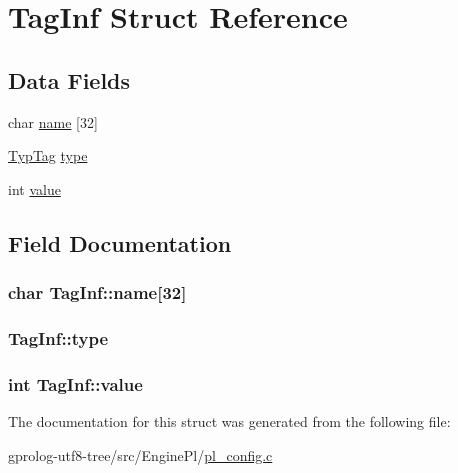 \hypertarget{structTagInf}{}\section{Tag\+Inf Struct Reference}
\label{structTagInf}
\subsection*{Data Fields}
\begin{DoxyCompactItemize}
\item 
char \hyperlink{structTagInf_a6dc0e60ac19532e7c8e1c30f73357c1c}{name} \mbox{[}32\mbox{]}
\item 
\hyperlink{pl__config_8c_a25e4946cfe40166e3e0aee5616116a87}{Typ\+Tag} \hyperlink{structTagInf_a1d109a0184537c9f448e28aa6c492b91}{type}
\item 
int \hyperlink{structTagInf_ae5a47ca79c53423fd961942af0647109}{value}
\end{DoxyCompactItemize}


\subsection{Field Documentation}
\subsubsection[{\texorpdfstring{name}{name}}]{\setlength{\rightskip}{0pt plus 5cm}char Tag\+Inf\+::name\mbox{[}32\mbox{]}}\hypertarget{structTagInf_a6dc0e60ac19532e7c8e1c30f73357c1c}{}\label{structTagInf_a6dc0e60ac19532e7c8e1c30f73357c1c}
\subsubsection[{\texorpdfstring{type}{type}}]{ Tag\+Inf\+::type}\hypertarget{structTagInf_a1d109a0184537c9f448e28aa6c492b91}{}\label{structTagInf_a1d109a0184537c9f448e28aa6c492b91}
\subsubsection[{\texorpdfstring{value}{value}}]{\setlength{\rightskip}{0pt plus 5cm}int Tag\+Inf\+::value}\hypertarget{structTagInf_ae5a47ca79c53423fd961942af0647109}{}\label{structTagInf_ae5a47ca79c53423fd961942af0647109}


The documentation for this struct was generated from the following file\+:\begin{DoxyCompactItemize}
\item 
gprolog-\/utf8-\/tree/src/\+Engine\+Pl/\hyperlink{pl__config_8c}{pl\+\_\+config.\+c}\end{DoxyCompactItemize}
